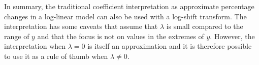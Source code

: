 In summary, the traditional coefficient interpretation as approximate percentage changes in a log-linear model can also be used with a log-shift transform.
The interpretation has some caveats that assume that $\lambda$ is small compared to the range of $y$ and that the focus is not on values in the extremes of $y$.
However, the interpretation when $\lambda = 0$ is itself an approximation and it is therefore possible to use it as a rule of thumb when $\lambda \ne 0$.


